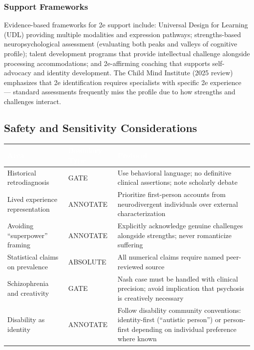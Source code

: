 \documentclass[11pt,letterpaper]{article}
\newcommand{\tableheader}[1]{\textbf{\sffamily\textcolor{white}{#1}}}
\begin{document}
\subsubsection{Support Frameworks}

Evidence-based frameworks for 2e support include: Universal Design for Learning (UDL) providing multiple modalities and expression pathways; strengths-based neuropsychological assessment (evaluating both peaks and valleys of cognitive profile); talent development programs that provide intellectual challenge alongside processing accommodations; and 2e-affirming coaching that supports self-advocacy and identity development. The Child Mind Institute (2025 review) emphasizes that 2e identification requires specialists with specific 2e experience --- standard assessments frequently miss the profile due to how strengths and challenges interact.

\subsection{Safety and Sensitivity Considerations}

\begin{center}
\begin{tabularx}{\textwidth}{L{4cm}L{3cm}X}
\toprule
{}
\tableheader{Area} & \tableheader{Boundary Type} & \tableheader{Protocol} \\
\midrule
Historical retrodiagnosis & GATE & Use behavioral language; no definitive clinical assertions; note scholarly debate \\
Lived experience representation & ANNOTATE & Prioritize first-person accounts from neurodivergent individuals over external characterization \\
Avoiding ``superpower'' framing & ANNOTATE & Explicitly acknowledge genuine challenges alongside strengths; never romanticize suffering \\
Statistical claims on prevalence & ABSOLUTE & All numerical claims require named peer-reviewed source \\
Schizophrenia and creativity & GATE & Nash case must be handled with clinical precision; avoid implication that psychosis is creatively necessary \\
Disability as identity & ANNOTATE & Follow disability community conventions: identity-first (``autistic person'') or person-first depending on individual preference where known \\
\bottomrule
\end{tabularx}
\end{center}
\end{document}
